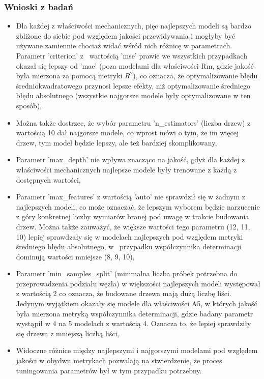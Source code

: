 \subsubsection{Wnioski z badań}
\begin{itemize}
    \item Dla każdej z właściwości mechanicznych, pięc najlepszych modeli są bardzo zbliżone do siebie pod względem jakości przewidywania i mogłyby być używane zamiennie chociaż widać wśród nich różnicę w parametrach. Parametr 'criterion' z~ wartością 'mse' prawie we wszystkich przypadkach okazał się lepszy od 'mae' (poza modelami dla właściwości Rm, gdzie jakość była mierzona za pomocą metryki $R^{2}$), co oznacza, że optymalizowanie błędu średniokwadratowego przynosi lepsze efekty, niż optymalizowanie średniego błędu absolutnego (wszystkie najgorsze modele były optymalizowane w ten sposób),
    \item Można także dostrzec, że wybór parametru 'n\_estimators' (liczba drzew) z wartością 10 dał najgorsze modele, co wprost mówi o tym, że im więcej drzew, tym model będzie lepszy, ale też bardziej skomplikowany,
    \item Parametr 'max\_depth' nie wpływa znacząco na jakość, gdyż dla każdej z właściwości mechanicznych najlepsze modele były trenowane z każdą z dostępnych wartości,
    \item Parametr 'max\_features' z wartością 'auto' nie sprawdził się w żadnym z najlepszych modeli, co może oznaczać, że lepszym wyborem będzie narzucenie z góry konkretnej liczby wymiarów branej pod uwagę w trakcie budowania drzew. Można także zauważyć, że większe wartości tego parametru (12, 11, 10) lepiej sprawdzały się w modelach najlepszych pod względem metryki średniego błędu absolutnego, w~ przypadku współczynnika determinacji dominują wartości mniejsze (8, 9, 10),
    \item Parametr 'min\_samples\_split' (minimalna liczba próbek potrzebna do przeprowadzenia podziału węzła) w większości najlepszych modeli występował z wartością 2 co oznacza, że budowane drzewa mają dużą liczbę liści. Jedynym wyjątkiem okazały się modele dla właściwości A5, w których jakość była mierzona metryką współczynnika determinacji, gdzie badany parametr wystąpił w 4 na 5 modelach z wartością 4. Oznacza to, że lepiej sprawdziły się drzewa z mniejszą liczbą liści,
    \item Widoczne różnice między najlepszymi i najgorszymi modelami pod względem jakości w obydwu metrykach pozwalają na stwierdzenie, że proces tuningowania parametrów był w tym przypadku potrzebny. 
\end{itemize}

